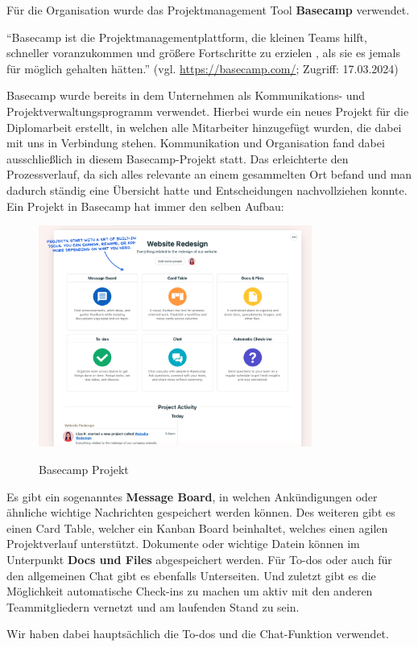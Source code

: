 Für die Organisation wurde das Projektmanagement Tool \textbf{Basecamp} verwendet.

“Basecamp ist die Projektmanagementplattform, die kleinen Teams hilft, schneller voranzukommen und größere Fortschritte zu erzielen , als sie es jemals für möglich gehalten hätten.”
\newline
(vgl. \url{https://basecamp.com/}; Zugriff: 17.03.2024)

Basecamp wurde bereits in dem Unternehmen als Kommunikations- und Projektverwaltungsprogramm verwendet. Hierbei wurde ein neues Projekt für die Diplomarbeit erstellt, in welchen alle Mitarbeiter hinzugefügt wurden, die dabei mit uns in Verbindung stehen.
Kommunikation und Organisation fand dabei ausschließlich in diesem Basecamp-Projekt statt. Das erleichterte den Prozessverlauf, da sich alles relevante an einem gesammelten Ort befand und man dadurch ständig eine Übersicht hatte und Entscheidungen nachvollziehen konnte.
Ein Projekt in Basecamp hat immer den selben Aufbau:

\begin{figure}[h!]
    \centering
    \includegraphics[width=0.8\textwidth]{pics/basecamp-project-overview.png}
    \caption{Basecamp Projekt}
    \cite{basecamp_project}
    \label{fig:mesh1}
\end{figure}

Es gibt ein sogenanntes \textbf{Message Board}, in welchen Ankündigungen oder ähnliche wichtige Nachrichten gespeichert werden können. Des weiteren gibt es einen Card Table, welcher ein Kanban Board beinhaltet, welches einen agilen Projektverlauf unterstützt. Dokumente oder wichtige Datein können im Unterpunkt \textbf{Docs und Files} abgespeichert werden. Für To-dos oder auch für den allgemeinen Chat gibt es ebenfalls Unterseiten. Und zuletzt gibt es die Möglichkeit automatische Check-ins zu machen um aktiv mit den anderen Teammitgliedern vernetzt und am laufenden Stand zu sein.

Wir haben dabei hauptsächlich die To-dos und die Chat-Funktion verwendet.